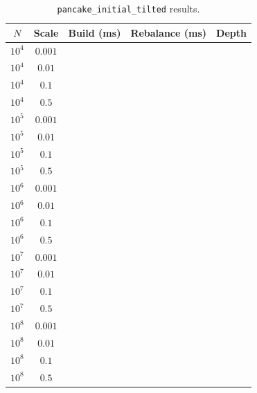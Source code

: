 \begin{table}[ht]
    \centering
    \caption{\texttt{pancake\_initial\_tilted} results.}
    \label{tab:pancake_tilted_results}
    \begin{tabular}{|c|c|c|c|c|}
        \hline
        \textbf{$N$} & \textbf{Scale} & \textbf{Build (ms)} & \textbf{Rebalance (ms)} & \textbf{Depth} \\
        \hline
        $10^4$ & $0.001$ & & & \\
        $10^4$ & $0.01$  & & & \\
        $10^4$ & $0.1$   & & & \\
        $10^4$ & $0.5$   & & & \\
        \hline
        $10^5$ & $0.001$ & & & \\
        $10^5$ & $0.01$  & & & \\
        $10^5$ & $0.1$   & & & \\
        $10^5$ & $0.5$   & & & \\
        \hline
        $10^6$ & $0.001$ & & & \\
        $10^6$ & $0.01$  & & & \\
        $10^6$ & $0.1$   & & & \\
        $10^6$ & $0.5$   & & & \\
        \hline
        $10^7$ & $0.001$ & & & \\
        $10^7$ & $0.01$  & & & \\
        $10^7$ & $0.1$   & & & \\
        $10^7$ & $0.5$   & & & \\
        \hline
        $10^8$ & $0.001$ & & & \\
        $10^8$ & $0.01$  & & & \\
        $10^8$ & $0.1$   & & & \\
        $10^8$ & $0.5$   & & & \\
        \hline
    \end{tabular}
\end{table}

